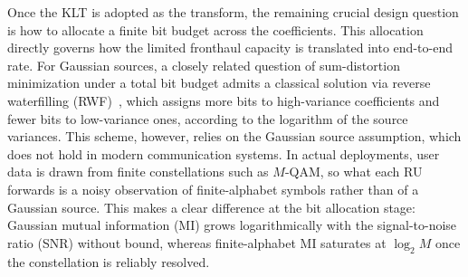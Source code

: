 \documentclass[10pt, twocolumn, comsoc]{IEEEtran}
\begin{document}
Once the KLT is adopted as the transform, the remaining crucial design question is how to allocate a finite bit budget across the coefficients. This allocation directly governs how the limited fronthaul capacity is translated into end-to-end rate.
For Gaussian sources, a closely related question of sum-distortion minimization under a total bit budget admits a classical solution via reverse waterfilling (RWF)~\cite{CoverThomas}, which assigns more bits to high-variance coefficients and fewer bits to low-variance ones, according to the logarithm of the source variances.
This scheme, however, relies on the Gaussian source assumption, which does not hold in modern communication systems. In actual deployments, user data is drawn from finite constellations such as $M$-QAM, so what each RU forwards is a noisy observation of finite-alphabet symbols rather than of a Gaussian source. This makes a clear difference at the bit allocation stage: Gaussian mutual information (MI) grows logarithmically with the signal-to-noise ratio (SNR) without bound, whereas finite-alphabet MI saturates at $\log_2 M$ once the constellation is reliably resolved.



\end{document}
